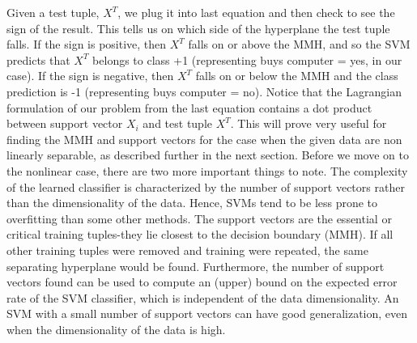 Given a test tuple, $X^T$, we plug it into last equation and then check to see the sign of the result. This tells us on which side of the hyperplane the test tuple falls. If the sign is positive, then $X^T$  falls on or above the MMH, and so the SVM predicts that $X^T$  belongs to class +1 (representing buys computer = yes, in our case). If the sign is negative, then $X^T$  falls on or below the MMH and the class prediction is -1 (representing buys computer = no). Notice that the Lagrangian formulation of our problem from the last equation contains a dot product between support vector $X_i$ and test tuple $X^T$. This will prove very useful for finding the MMH and support vectors for the case when the given data are non linearly separable, as described further in the next section. Before we move on to the nonlinear case, there are two more important things to note. The complexity of the learned classifier is characterized by the number of support vectors rather than the dimensionality of the data. Hence, SVMs tend to be less prone to overfitting than some other methods. The support vectors are the essential or critical training tuples-they lie closest to the decision boundary (MMH). If all other training tuples were removed and training were repeated, the same separating hyperplane would be found. Furthermore, the number of support vectors found can be used to compute an (upper) bound on the expected error rate of the SVM classifier, which is independent of the data dimensionality. An SVM with a small number of support vectors can have good generalization, even when the dimensionality of the data is high.

